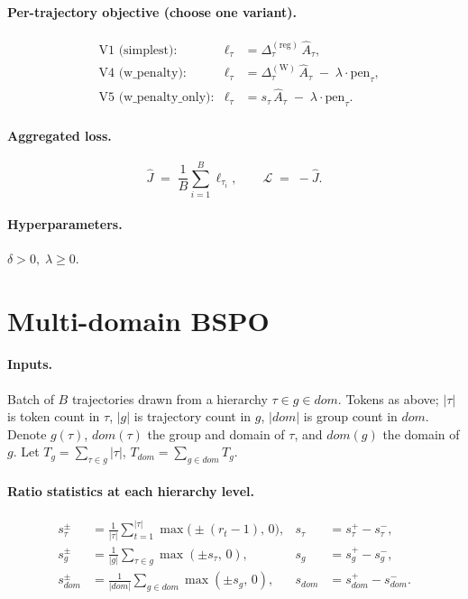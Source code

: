 \documentclass[11pt]{article}
\begin{document}
\paragraph{Per-trajectory objective (choose one variant).}
\begin{align*}
&\text{V1 (simplest):}       &\ell_\tau &= \Delta_\tau^{(\mathrm{reg})}\,\hat A_\tau, \\
&\text{V4 (w\_penalty):}      &\ell_\tau &= \Delta_\tau^{(\mathrm{W})}\,\hat A_\tau \;-\; \lambda\cdot\mathrm{pen}_\tau, \\
&\text{V5 (w\_penalty\_only):}&\ell_\tau &= s_\tau\,\hat A_\tau \;-\; \lambda\cdot\mathrm{pen}_\tau.
\end{align*}

\paragraph{Aggregated loss.}
\[
\hat J \;=\; \frac{1}{B}\sum_{i=1}^{B}\ell_{\tau_i},
\qquad
\mathcal L \;=\; -\hat J.
\]

\paragraph{Hyperparameters.}
$\delta>0,\;\lambda\geq 0$.

\section{Multi-domain BSPO}

\paragraph{Inputs.}
Batch of $B$ trajectories drawn from a hierarchy $\tau \in g \in dom$.
Tokens as above; $|\tau|$ is token count in $\tau$, $|g|$ is trajectory
count in $g$, $|dom|$ is group count in $dom$. Denote $g(\tau)$, $dom(\tau)$
the group and domain of $\tau$, and $dom(g)$ the domain of $g$. Let
$T_g = \sum_{\tau\in g}|\tau|$, $T_{dom}=\sum_{g\in dom}T_g$.

\paragraph{Ratio statistics at each hierarchy level.}
\begin{align*}
s_\tau^{\pm}   &= \tfrac{1}{|\tau|}\sum_{t=1}^{|\tau|}\max\!\bigl(\pm(r_t-1),\,0\bigr),
  & s_\tau &= s_\tau^{+}-s_\tau^{-}, \\
s_g^{\pm}      &= \tfrac{1}{|g|}\sum_{\tau\in g}\max(\pm s_\tau,\,0),
  & s_g &= s_g^{+}-s_g^{-}, \\
s_{dom}^{\pm}  &= \tfrac{1}{|dom|}\sum_{g\in dom}\max(\pm s_g,\,0),
  & s_{dom} &= s_{dom}^{+}-s_{dom}^{-}.
\end{align*}
\end{document}
